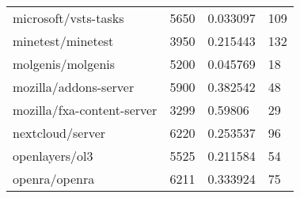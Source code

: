 \begin{table}[]
\begin{tabular}{llll}
microsoft/vsts-tasks                        & 5650                               & 0.033097                                                                                                          & 109                                                                                                           \\
minetest/minetest                           & 3950                               & 0.215443                                                                                                          & 132                                                                                                           \\
molgenis/molgenis                           & 5200                               & 0.045769                                                                                                          & 18                                                                                                            \\
mozilla/addons-server                       & 5900                               & 0.382542                                                                                                          & 48                                                                                                            \\
mozilla/fxa-content-server                  & 3299                               & 0.59806                                                                                                           & 29                                                                                                            \\
nextcloud/server                            & 6220                               & 0.253537                                                                                                          & 96                                                                                                            \\
openlayers/ol3                              & 5525                               & 0.211584                                                                                                          & 54                                                                                                            \\
openra/openra                               & 6211                               & 0.333924                                                                                                          & 75                                                                                                            \\

\end{tabular}
\end{table}
